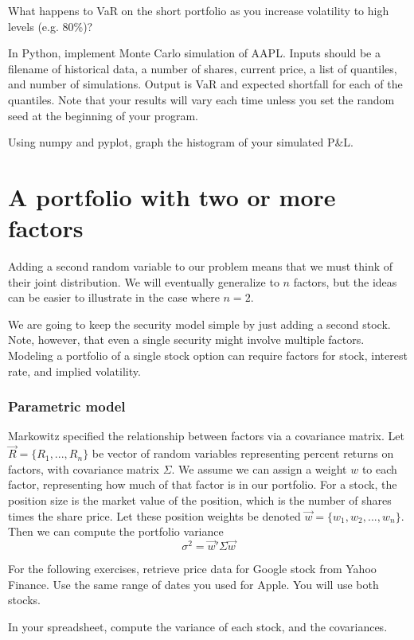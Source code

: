\documentclass{report}
\numberwithin{problem}{chapter} %
\let\oldroblem\problem
\renewcommand{\problem}{ \oldroblem  \normalfont}
\newcommand{\pnlend}{P\&L}
\begin{document}
\problem What happens to VaR on the short portfolio as you increase volatility to high levels (e.g. 80\%)?

\problem In Python, implement Monte Carlo simulation of AAPL. Inputs should be a filename of historical data, a number of shares, current price, a list of quantiles, and number of simulations. Output is VaR and expected shortfall for each of the quantiles. Note that your results will vary each time unless you set the random seed at the beginning of your program.

\problem Using numpy and pyplot, graph the histogram of your simulated \pnlend. 

\section{A portfolio with two or more factors}
Adding a second random variable to our problem means that we must think of their joint distribution. We will eventually generalize to $n$ factors, but the ideas can be easier to illustrate in the case where $n=2$. 

We are going to keep the security model simple by just adding a second stock. Note, however, that even a single security might involve multiple factors. Modeling a portfolio of a single stock option can require factors for stock, interest rate, and implied volatility. 

\subsubsection{Parametric model}
Markowitz specified the relationship between factors via a covariance matrix. Let $\vec{R}=\{R_1, ...,R_n\}$ be vector of random variables representing percent returns on factors, with covariance matrix $\Sigma$. We assume we can assign a weight $w$ to each factor, representing how much of that factor is in our portfolio. For a stock, the position size is the market value of the position, which is the number of shares times the share price. Let these position weights be denoted $\vec{w} = \{ w_1, w_2, ..., w_n\}$. Then we can compute the portfolio variance 
\begin{equation}
\sigma^2 = \vec{w}' \Sigma \vec{w}
\end{equation}

For the following exercises, retrieve price data for Google stock from Yahoo Finance. Use the same range of dates you used for Apple. You will use both stocks. 

\problem In your spreadsheet, compute the variance of each stock, and the covariances.
\end{document}
